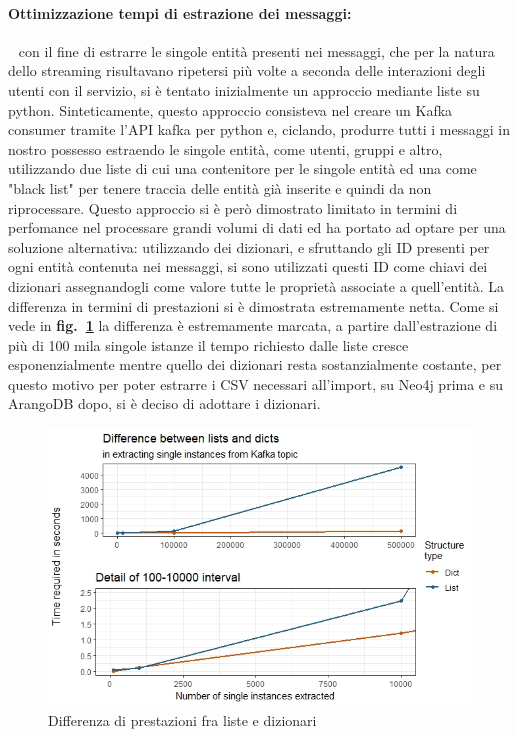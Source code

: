 \documentclass[fleqn,10pt]{SelfArx} %
\begin{document}
{{\paragraph{Ottimizzazione tempi di estrazione dei messaggi:}  $~~$ con il fine di estrarre le singole entità presenti nei messaggi, che per la natura dello streaming risultavano ripetersi più volte a seconda delle interazioni degli utenti con il servizio, si è tentato inizialmente un approccio mediante liste su python. 
Sinteticamente, questo approccio consisteva nel creare un Kafka consumer tramite l'API kafka per python e, ciclando, produrre tutti i messaggi in nostro possesso estraendo le singole entità, come utenti, gruppi e altro, utilizzando due liste di cui una contenitore per le singole entità ed una come "black list" per tenere traccia delle entità già inserite e quindi da non riprocessare. 
Questo approccio si è però dimostrato limitato in termini di perfomance nel processare grandi volumi di dati ed ha portato ad optare per una soluzione alternativa: utilizzando dei dizionari, e sfruttando gli ID presenti per ogni entità contenuta nei messaggi, si sono utilizzati questi ID come chiavi dei dizionari assegnandogli come valore tutte le proprietà associate a quell'entità. 
La differenza in termini di prestazioni si è dimostrata estremamente netta. 
Come si vede in \textbf{fig.~\ref{plot_lists_dicts}} la differenza è estremamente marcata, a partire dall'estrazione di più di 100 mila singole istanze il tempo richiesto dalle liste cresce esponenzialmente mentre quello dei dizionari resta sostanzialmente costante, per questo motivo per poter estrarre i CSV necessari all'import, su Neo4j prima e su ArangoDB dopo, si è deciso di adottare i dizionari.
\begin{figure}
\centering
\includegraphics[scale=0.54]{viz_benchmark_lists_dicts.jpeg}
\caption{\footnotesize \label{plot_lists_dicts} Differenza di prestazioni fra liste e dizionari}
\end{figure}
}}
\end{document}
